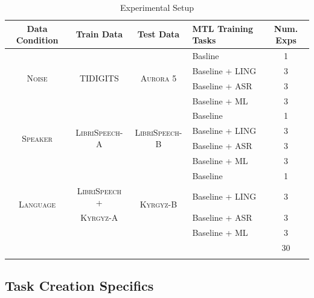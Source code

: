 \documentclass[10pt,a4paper]{article}
\begin{document}
\begin{table}[!htbp]
  \centering
  \begin{adjustbox}{width=.75\textwidth}
    \begin{tabular}{ccclc}
      \toprule
      \textbf{Data Condition} & \textbf{Train Data} & \textbf{Test Data} & \textbf{MTL Training Tasks} & \textbf{Num. Exps} \\
      \midrule
      \multirow{4}{*}{\textsc{Noise}} & \multirow{4}{*}{\textsc{TIDIGITS}} & \multirow{4}{*}{\textsc{Aurora 5}} & Basline & 1\\
      & & & Baseline + LING & 3   \\
      & & & Baseline + ASR  & 3  \\
      & & & Baseline + ML   & 3  \\
      \midrule
      \multirow{4}{*}{\textsc{Speaker}} & \multirow{4}{*}{\textsc{LibriSpeech-A}} & \multirow{4}{*}{\textsc{LibriSpeech-B}} & Baseline & 1 \\
      & & & Baseline + LING & 3  \\
      & & & Baseline + ASR  & 3  \\
      & & & Baseline + ML   & 3  \\     \midrule
      \multirow{4}{*}{\textsc{Language}} & & \multirow{4}{*}{\textsc{Kyrgyz-B}} & Baseline & 1\\
      & \textsc{LibriSpeech +} & & Baseline + LING  & 3 \\
      &  \textsc{Kyrgyz-A} & & Baseline + ASR   & 3 \\
      & & & Baseline + ML & 3 \\
      \midrule
      &&&& 30\\
      \bottomrule\\
    \end{tabular}
    \label{table:data}
  \end{adjustbox}
  
  \caption{Experimental Setup}
  
\end{table}


\subsection{Task Creation Specifics}
\end{document}
